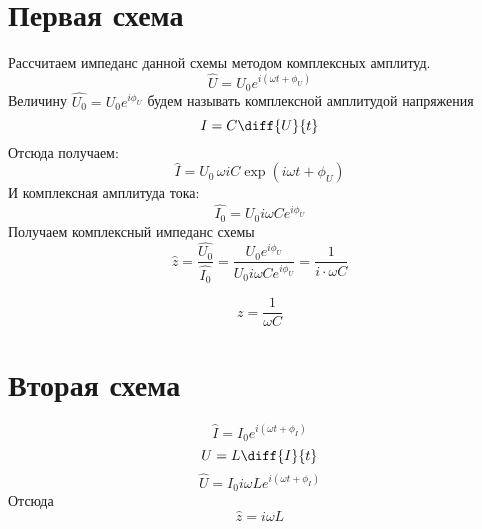 



\def\labauthors{Понур К.А., Сарафанов Ф.Г., Сидоров Д.А.}
\def\labgroup{420}
\def\labnumber{210}
\def\labtheme{Исследование линейных двухполюсников и четырёхполюсников}
\renewcommand{\vec}{\mathbf}


\tableofcontents
\newpage
\section{Первая схема}
\begin{center}
	
\end{center}

Рассчитаем импеданс данной схемы методом комплексных амплитуд.
\begin{equation}
	\hat{U}=U_0 e^{i(\omega t+\phi_U)}
\end{equation}
Величину $\hat{U_0}=U_0e^{i\phi_U}$ будем называть комплексной амплитудой напряжения
\begin{equation}
	I=C\diff{U}{t}
\end{equation}
Отсюда получаем:
\begin{equation}
	\hat{I}=U_0\,\omega i C\exp(i\omega t+\phi_U)
\end{equation}
И комплексная амплитуда тока:
\begin{equation}
	\hat{I_0}=U_0i\omega C e^{i\phi_U}
\end{equation}
Получаем комплексный импеданс схемы
\begin{equation}
	\hat{z}=\frac{\hat{U_0}}{\hat{I_0}}=\frac{U_0e^{i\phi_U}}{U_0i\omega C e^{i\phi_U}}=\frac{1}{i\cdot\omega C}
\end{equation}

\begin{equation}
	z=\frac{1}{\omega C}
\end{equation}
\section{Вторая схема}
\begin{center}

\end{center}

\begin{equation}
	\hat{I}=I_0e^{i(\omega t+\phi_I)}
\end{equation}
\begin{equation}
	U=L\diff{I}{t}
\end{equation}
\begin{equation}
	\hat{U}=I_0i\omega L e^{i(\omega t +\phi_I)}
\end{equation}
Отсюда
\begin{equation}
	\hat{z}=i\omega L
	\end{equation}



